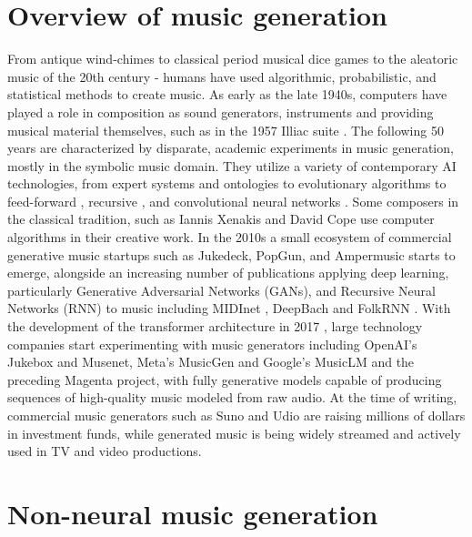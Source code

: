 \section{Overview of music generation}
From antique wind-chimes to classical period musical dice games to the aleatoric music of the 20th century - humans have used algorithmic, probabilistic, and statistical methods to create music. As early as the late 1940s, computers have played a role in composition as sound generators, instruments \cite{France-Presse_2016} and providing musical material themselves, such as in the 1957 Illiac suite \cite{Hiller_Isaacson_1959}. The following 50 years are characterized by disparate, academic experiments in music generation, mostly in the symbolic music domain. They utilize a variety of contemporary AI technologies, from expert systems and ontologies \cite{Hiller_Isaacson_1959}\cite{Ebcioğlu_1994} to evolutionary algorithms \cite{Polito_Daida_Bersano-Begey_1997} to feed-forward \cite{Todd_1989}, recursive \cite{Mozer_1994}, and convolutional neural networks \cite{coconet}. Some composers in the classical tradition, such as Iannis Xenakis \cite{Xenakis_1992} and David Cope\cite{Cope_1989} use computer algorithms in their creative work. 
In the 2010s a small ecosystem of commercial generative music startups such as Jukedeck, PopGun, and Ampermusic \cite{Featherstone_2017} starts to emerge, alongside an increasing number of publications applying deep learning, particularly Generative Adversarial Networks (GANs), and Recursive Neural Networks (RNN) to music including MIDInet \cite{midinet}, DeepBach \cite{Hadjeres_Pachet_Nielsen_2017} and FolkRNN \cite{Sturm_Ben-Tal_2016}. With the development of the transformer architecture in 2017 \cite{Vaswani_Shazeer_Parmar_Uszkoreit_Jones_Gomez_Kaiser_Polosukhin_2017}, large technology companies start experimenting with music generators including OpenAI’s Jukebox \cite{Dhariwal_Jun_Payne_Kim_Radford_Sutskever_2020} and Musenet\cite{Christine_2019}, Meta’s MusicGen\cite{copet2023simple} and Google’s MusicLM \cite{Agostinelli_Denk_Borsos_Engel_Verzetti_Caillon_Huang_Jansen_Roberts_Tagliasacchi_et_al._2023} and the preceding Magenta project, with fully generative models capable of producing sequences of high-quality music modeled from raw audio. At the time of writing, commercial music generators such as Suno and Udio are raising millions of dollars in investment funds\cite{Stassen_2024}, while generated music is being widely streamed and actively used in TV and video productions. 

\section{Non-neural music generation}

